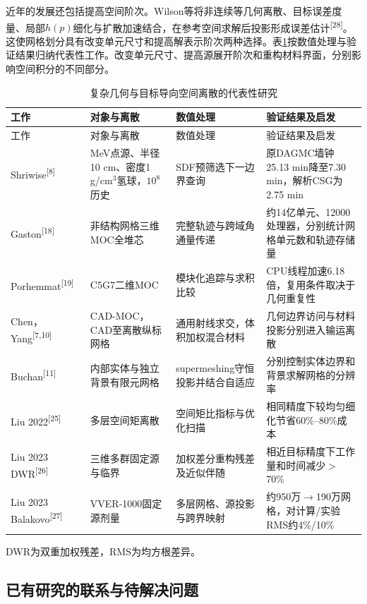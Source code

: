\documentclass[UTF8, zihao=-4, fontset=none, a4paper]{ctexart}
\newcommand{\upcite}[1]{\textsuperscript{[#1]}}
\begin{document}
近年的发展还包括提高空间阶次。Wilson等将非连续等几何离散、目标误差度量、局部\(h(p)\)细化与扩散加速结合，在参考空间求解后投影形成误差估计\upcite{28}。这使网格划分具有改变单元尺寸和提高解表示阶次两种选择。表\ref{tab:1}按数值处理与验证结果归纳代表性工作。改变单元尺寸、提高源展开阶次和重构材料界面，分别影响空间积分的不同部分。 \begin{longtable}{@{}>{\raggedright\arraybackslash}p{}>{\raggedright\arraybackslash}p{}>{\raggedright\arraybackslash}p{}>{\raggedright\arraybackslash}p{}@{}}
\caption{复杂几何与目标导向空间离散的代表性研究}\label{tab:1}\\
\toprule
工作 & 对象与离散 & 数值处理 & 验证结果及启发 \\
\midrule
\endfirsthead
\toprule
工作 & 对象与离散 & 数值处理 & 验证结果及启发 \\
\midrule
\endhead
\bottomrule
\endlastfoot
Shriwise\upcite{8} & 5 MeV点源、半径10 cm、密度1 g/cm$^3$氢球，$10^8$历史 & SDF预筛选下一边界查询 & 原DAGMC墙钟25.13 min降至7.30 min，解析CSG为2.75 min \\
Gaston\upcite{18} & 非结构网格三维MOC全堆芯 & 完整轨迹与跨域角通量传递 & 约14亿单元、12000处理器，分别统计网格单元数和轨迹存储量 \\
Porhemmat\upcite{19} & C5G7二维MOC & 模块化追踪与求积比较 & 16 CPU线程加速6.18倍，复用条件取决于几何重复性 \\
Chen，Yang\upcite{7,10} & CAD-MOC，CAD至离散纵标网格 & 通用射线求交，体积加权混合材料 & 几何边界访问与材料投影分别进入输运离散 \\
Buchan\upcite{11} & 内部实体与独立背景有限元网格 & supermeshing守恒投影并结合自适应 & 分别控制实体边界和背景求解网格的分辨率 \\
Liu 2022\upcite{25} & 多层空间矩离散 & 空间矩比指标与优化扫描 & 相同精度下较均匀细化节省60\%--80\%成本 \\
Liu 2023 DWR\upcite{26} & 三维多群固定源与临界 & 加权差分重构残差及近似伴随 & 相近目标精度下工作量和时间减少$>$70\% \\
Liu 2023 Balakovo\upcite{27} & VVER-1000固定源剂量 & 多层网格、源投影与跨界映射 & 约950万$\rightarrow$190万网格，对计算/实验RMS约4\%/10\% \\
\end{longtable}

DWR为双重加权残差，RMS为均方根差异。

\subsection{已有研究的联系与待解决问题}
\end{document}
